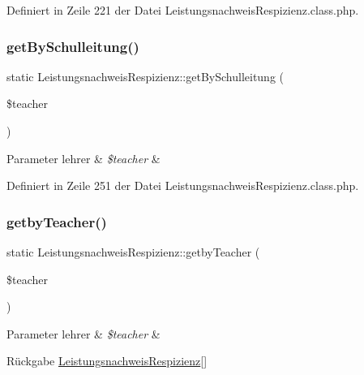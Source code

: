 Definiert in Zeile 221 der Datei Leistungsnachweis\+Respizienz.\+class.\+php.

\mbox{\label{class_leistungsnachweis_respizienz_a3bbbec25b24084db198d29d55000ed50}} 
\subsubsection{\texorpdfstring{get\+By\+Schulleitung()}{getBySchulleitung()}}
{\footnotesize\ttfamily static Leistungsnachweis\+Respizienz\+::get\+By\+Schulleitung (\begin{DoxyParamCaption}\item[{}]{\$teacher }\end{DoxyParamCaption})\hspace{0.3cm}{\ttfamily [static]}}


\begin{DoxyParams}[1]{Parameter}
lehrer & {\em \$teacher} & \\
\hline
\end{DoxyParams}


Definiert in Zeile 251 der Datei Leistungsnachweis\+Respizienz.\+class.\+php.

\mbox{\label{class_leistungsnachweis_respizienz_a7bcfd3eb1016132ca9b69529efbb2260}} 
\subsubsection{\texorpdfstring{getby\+Teacher()}{getbyTeacher()}}
{\footnotesize\ttfamily static Leistungsnachweis\+Respizienz\+::getby\+Teacher (\begin{DoxyParamCaption}\item[{}]{\$teacher }\end{DoxyParamCaption})\hspace{0.3cm}{\ttfamily [static]}}


\begin{DoxyParams}[1]{Parameter}
lehrer & {\em \$teacher} & \\
\hline
\end{DoxyParams}
\begin{DoxyReturn}{Rückgabe}
\mbox{\hyperlink{class_leistungsnachweis_respizienz}{Leistungsnachweis\+Respizienz}}\mbox{[}\mbox{]} 
\end{DoxyReturn}


